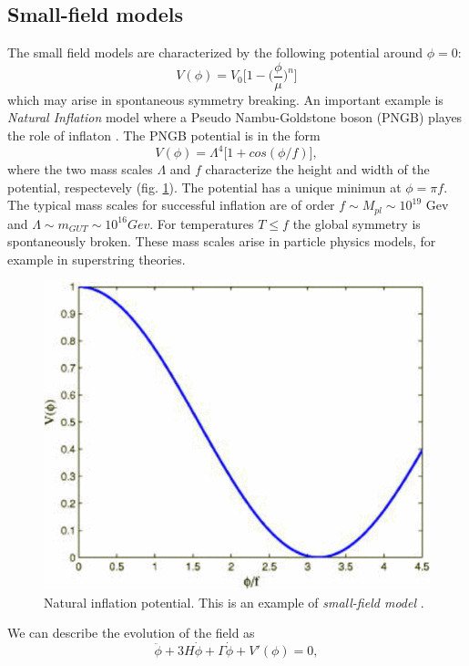 \documentclass[11pt,a4paper,twoside]{book}
\begin{document}
 \subsection{Small-field models}
 The small field models are characterized by the following potential around $\phi=0$:
 \begin{equation}
 	\label{Chap2:small-field1}
 	V(\phi) = V_{0}\Big [1-\Big (\frac{\phi}{\mu}\Big)^{n} \Big]
 \end{equation}
which may arise in spontaneous symmetry breaking.
An important example is \textit{Natural Inflation} model where a Pseudo Nambu-Goldstone boson (PNGB) playes the role of inflaton \cite{Chap2:NaturalInflation}. The PNGB potential is in  the form
\begin{equation}
	\label{Chap2:PNGBPotential}
	V(\phi) = \Lambda^{4}\big [1 + cos(\phi/f) \big],
\end{equation}  
 where the two mass scales $\Lambda$ and $ f $ characterize the height and width of the potential, respectevely (fig. \ref{fig:naturalinflationinflationdynamics-and-reheating}). The potential has a unique minimun at $ \phi = \pi f $. The typical mass scales for successful inflation are of order  $ f \sim M_{pl} \sim 10^{19} $ Gev and $ \Lambda \sim m_{GUT} \sim 10^{16} Gev $. For temperatures $ T \le f $ the global symmetry is spontaneously broken. These mass scales arise in particle physics models, for example in superstring theories. \\
 \begin{figure}
 	\centering
 	\includegraphics[width=0.5\linewidth, height=0.25\textheight]{"Images/Chap2/NaturalInflation_InflationDynamics and reheating"}
 	\caption{Natural inflation potential. This is an example of \textit{small-field model} \cite{InflationDynamicsAndReheating:chap1}.}
 	\label{fig:naturalinflationinflationdynamics-and-reheating}
 \end{figure}
  We can describe the evolution of the field as 
 \begin{equation}
 	\label{Chap2:eomSmallFieldModel}
 	\ddot{\phi} + 3H\dot{\phi} + \Gamma\dot{\phi} + V'(\phi) = 0,
 \end{equation} 
\end{document}
